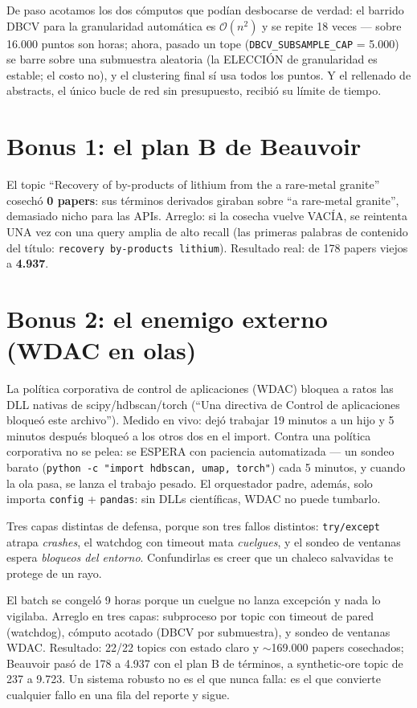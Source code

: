 \documentclass[11pt,a4paper]{article}
\begin{document}
De paso acotamos los dos cómputos que podían desbocarse de verdad:
el barrido DBCV para la granularidad automática es $\mathcal{O}(n^2)$ y se repite
18 veces --- sobre 16.000 puntos son horas; ahora, pasado un tope
(\texttt{DBCV\_SUBSAMPLE\_CAP} = 5.000) se barre sobre una submuestra aleatoria
(la ELECCIÓN de granularidad es estable; el costo no), y el clustering final sí usa
todos los puntos. Y el rellenado de abstracts, el único bucle de red sin presupuesto,
recibió su límite de tiempo.

\section{Bonus 1: el plan B de Beauvoir}

El topic ``Recovery of by-products of lithium from the a rare-metal granite'' cosechó
\textbf{0 papers}: sus términos derivados giraban sobre ``a rare-metal granite'', demasiado
nicho para las APIs. Arreglo: si la cosecha vuelve VACÍA, se reintenta UNA vez con una
query amplia de alto recall (las primeras palabras de contenido del título:
\texttt{recovery by-products lithium}). Resultado real: de 178 papers viejos a
\textbf{4.937}.

\section{Bonus 2: el enemigo externo (WDAC en olas)}

La política corporativa de control de aplicaciones (WDAC) bloquea a ratos las DLL
nativas de scipy/hdbscan/torch (``Una directiva de Control de aplicaciones bloqueó este
archivo''). Medido en vivo: dejó trabajar 19 minutos a un hijo y 5 minutos después
bloqueó a los otros dos en el import. Contra una política corporativa no se pelea:
se ESPERA con paciencia automatizada --- un sondeo barato
(\texttt{python -c "import hdbscan, umap, torch"}) cada 5 minutos, y cuando la ola
pasa, se lanza el trabajo pesado. El orquestador padre, además, solo importa
\texttt{config} + \texttt{pandas}: sin DLLs científicas, WDAC no puede tumbarlo.

\begin{ojo}
Tres capas distintas de defensa, porque son tres fallos distintos: \texttt{try/except}
atrapa \emph{crashes}, el watchdog con timeout mata \emph{cuelgues}, y el sondeo de
ventanas espera \emph{bloqueos del entorno}. Confundirlas es creer que un chaleco
salvavidas te protege de un rayo.
\end{ojo}

\begin{resumen}
El batch se congeló 9 horas porque un cuelgue no lanza excepción y nada lo vigilaba.
Arreglo en tres capas: subproceso por topic con timeout de pared (watchdog), cómputo
acotado (DBCV por submuestra), y sondeo de ventanas WDAC. Resultado: 22/22 topics con
estado claro y $\sim$169.000 papers cosechados; Beauvoir pasó de 178 a 4.937 con el
plan B de términos, a synthetic-ore topic de 237 a 9.723. Un sistema robusto no es el que nunca falla:
es el que convierte cualquier fallo en una fila del reporte y sigue.
\end{resumen}
\end{document}
